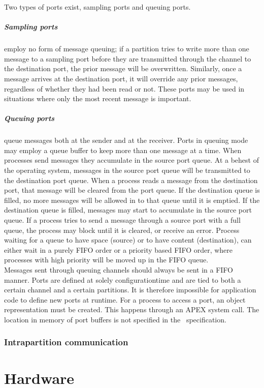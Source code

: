 Two types of ports exist, sampling ports and queuing ports. 
\subparagraph{Sampling ports} employ no form of message queuing; if a partition tries to write more than one message to a sampling port
before they are transmitted through the channel to the destination port, the prior message will be overwritten. Similarly, once a message arrives at the destination port,
it will override any prior messages, regardless of whether they had been read or not. These ports may be used in situations where only the most recent message is important.
\subparagraph{Queuing ports} queue messages both at the sender and at the receiver. Ports in queuing mode may employ a queue buffer to keep more than one message at a time.
When processes send messages they accumulate in the source port queue. At a behest of the operating system, messages in the source port queue will be transmitted to the destination port queue.
When a process reads a message from the destination port, that message will be cleared from the port queue. If the destination queue is filled, no more messages will be allowed
in to that queue until it is emptied. If the destination queue is filled, messages may start to accumulate in the source port queue. If a process tries to send a message through a
source port with a full queue, the process may block until it is cleared, or receive an error.
Process waiting for a queue to have space (source) or to have content (destination), can either wait in a purely FIFO order or a priority based FIFO order, where processes with high priority
will be moved up in the FIFO queue.\\

Messages sent through queuing channels should always be sent in a FIFO manner.
Ports are defined at solely configurationtime and are tied to both a certain channel and a certain partitions.
It is therefore impossible for application code to define new ports at runtime. 
For a process to access a port, an object representation must be created. This happens through an APEX system call.
The location in memory of port buffers is not specified in the \arinc\ specification.

\subsubsection{Intrapartition communication}

\section{Hardware}
